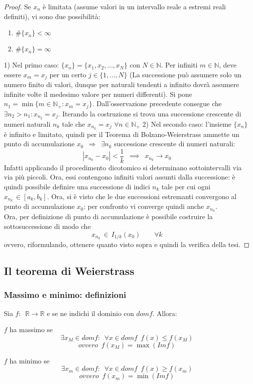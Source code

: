 \documentclass[10pt, oneside]{book}
\theoremstyle{plain}
\begin{document}
\begin{proof}
    Se $x_n$ è limitata (assume valori in un intervallo reale a estremi reali definiti), vi sono due possibilità:
    \begin{enumerate}
    \item $\#\{x_n\} < \infty$
    \item $\#\{x_n\} = \infty$
    \end{enumerate}
    1) Nel primo caso: $\{x_n\} = \{x_1, x_2, ... , x_N\}$ con $N \in \mathbb{N}$. Per infiniti $m \in \mathbb{N}$, deve essere $x_m = x_j$ per un certo $j \in \{1, ..., N\}$ (La successione può assumere solo un numero finito di valori, dunque per naturali tendenti a infinito dovrà assumere infinite volte il medesimo valore per numeri differenti). \newline Si pone $n_1 = \min \{m \in \mathbb{N}_+ : x_m = x_j\}$. Dall'osservazione precedente consegue che $\exists n_2 > n_1 : x_{n_2} = x_j$. \newline Iterando la costruzione si trova una successione crescente di numeri naturali $n_k$ tale che $x_{n_k} = x_j$ $\forall n \in \mathbb{N}_+$
    2) Nel secondo caso: l'insieme $\{x_n\}$ è infinito e limitato, quindi per il Teorema di Bolzano-Weierstrass ammette un punto di accumulazione $x_0 \enspace \Rightarrow \enspace \exists n_k$ successione crescente di numeri naturali:
    \[|x_{n_k} - x_0| < \frac{1}{k} \enspace \implies \enspace x_{n_k} \rightarrow x_0\]
Infatti applicando il procedimento dicotomico si determinano sottointervalli via via più piccoli. Ora, essi contengono infiniti valori assunti dalla successione: è quindi possibile definire una successione di indici $n_k$ tale per cui ogni $\displaystyle x_{n_k} \, \in [a_k, b_k]$. Ora, si è visto che le due successioni estremanti convergono al punto di accumulazione $x_0$: per confronto vi converge quindi anche $\displaystyle x_{n_k}$.\\
Ora, per definizione di punto di accumulazione è possibile costruire la sottosuccessione di modo che
\[x_{n_k} \, \in \, I_{1/k}(x_0) \qquad \forall k\]
ovvero, riformulando, ottenere quanto visto sopra e quindi la verifica della tesi.
\end{proof}

\subsection{Il teorema di Weierstrass}

\subsubsection{Massimo e minimo: definizioni}
Sia $f : \enspace \mathbb{R} \longrightarrow \mathbb{R}$ e se ne indichi il dominio con $dom f$. Allora:
\begin{defin}
$f$ ha massimo se \[\exists x_M \in dom f : \enspace \forall x \in dom f \enspace f(x) \leq f(x_M)\]
\[ovvero \enspace f(x_M) = \max (Im f)\]
\end{defin}
\begin{defin}
$f$ ha minimo se \[\exists x_m \in dom f : \enspace \forall x \in dom f \enspace f(x) \geq f(x_m)\]
\[ovvero \enspace f(x_m) = \min (Im f)\]
\end{defin}
\end{document}
